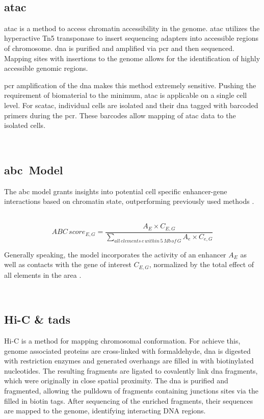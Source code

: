     \subsection{\acs{atac}}
    \acf{atac} is a method to access chromatin accessibility in the genome. \Ac{atac} utilizes the hyperactive Tn5 transponase to insert sequencing adapters into accessible regions of chromosome. \ac{dna} is purified and amplified via \ac{pcr} and then sequenced. Mapping sites with insertions to the genome allows for the identification of highly accessible genomic regions. \cite{buenrostroTranspositionNativeChromatin2013, buenrostroATACseqMethodAssaying2015}

    \ac{pcr} amplification of the \ac{dna} makes this method extremely sensitive. Pushing the requirement of biomaterial to the minimum, \ac{atac} is applicable on a single cell level. For sc\ac{atac}, individual cells are isolated and their \ac{dna} tagged with barcoded primers during the \ac{pcr}. These barcodes allow mapping of \ac{atac} data to the isolated cells. \cite{buenrostroSinglecellChromatinAccessibility2015}

    \subsection{\acs{abc} Model}
    The \acf{abc} model grants insights into potential cell specific enhancer-gene interactions based on chromatin state, outperforming previously used methods \cite{fulcoActivitybycontactModelEnhancer2019a, nasserGenomewideEnhancerMaps2021a}.

        $$ ABC\,score_{E, G} = \frac{A_E \times C_{E,G}}{\sum\limits_{all\,elements\,e\,within\,5\,Mb\,of\,G} A_e \times C_{e, G}} $$

    Generally speaking, the model incorporates the activity of an enhancer $A_E$ as well as contacts with the gene of interest $C_{E,G}$, normalized by the total effect of all elements in the area \cite{fulcoActivitybycontactModelEnhancer2019a, nasserGenomewideEnhancerMaps2021a}.

    \subsection{Hi-C \& \acsp{tad}}
    Hi-C is a method for mapping chromosomal conformation. For achieve this, genome associated proteins are cross-linked with formaldehyde, \ac{dna} is digested with restriction enzymes and generated overhangs are filled in with biotinylated nucleotides. The resulting fragments are ligated to covalently link \ac{dna} fragments, which were originally in close spatial proximity. The \ac{dna} is purified and fragmented, allowing the pulldown of fragments containing junctions sites via the filled in biotin tags. After sequencing of the enriched fragments, their sequences are mapped to the genome, identifying interacting DNA regions. \cite{lieberman-aidenComprehensiveMappingLongRange2009, witDecade3CTechnologies2012}

